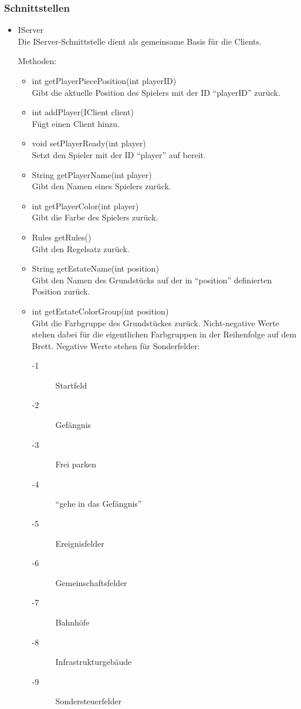 \documentclass[a4paper,10pt]{article}
\begin{document}
\subsubsection{Schnittstellen}
\begin{itemize}
\item IServer \\
Die IServer-Schnittstelle dient als gemeinsame Basis für die Clients.

Methoden:
\begin{itemize}
\item int getPlayerPiecePosition(int playerID) \\
Gibt die aktuelle Position des Spielers mit der ID "`playerID"' zurück.
\item int addPlayer(IClient client) \\
Fügt einen Client hinzu.
\item void setPlayerReady(int player) \\
Setzt den Spieler mit der ID "`player"' auf bereit.
\item String getPlayerName(int player) \\
Gibt den Namen eines Spielers zurück.
\item int getPlayerColor(int player) \\
Gibt die Farbe des Spielers zurück.
\item Rules getRules() \\
Gibt den Regelsatz zurück.
\item String getEstateName(int position) \\
Gibt den Namen des Grundstücks auf der in "`position"' definierten Position zurück.
\item int getEstateColorGroup(int position) \\
Gibt die Farbgruppe des Grundstückes zurück. Nicht-negative Werte stehen dabei für die eigentlichen Farbgruppen in der Reihenfolge auf dem Brett. Negative Werte stehen für Sonderfelder:
\begin{description}
\item[-1] Startfeld
\item[-2] Gefängnis
\item[-3] Frei parken
\item[-4] "`gehe in das Gefängnis"'
\item[-5] Ereignisfelder
\item[-6] Gemeinschaftsfelder
\item[-7] Bahnhöfe
\item[-8] Infrastrukturgebäude
\item[-9] Sondersteuerfelder

\end{description}
\end{itemize}
\end{itemize}
\end{document}
